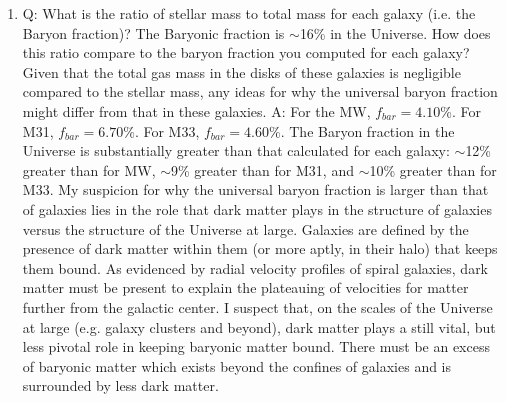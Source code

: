 \documentclass{aastex62}
\begin{document}
\begin{enumerate}
  \item Q: What is the ratio of stellar mass to total mass for each galaxy (i.e. the Baryon fraction)? The Baryonic fraction is $\sim$16\% in the Universe. How does this ratio compare to the baryon fraction you computed for each galaxy? Given that the total gas mass in the disks of these galaxies is negligible compared to the stellar mass, any ideas for why the universal baryon fraction might differ from that in these galaxies.
  \newline
  \newline
  A: For the MW, $f_{bar}=4.10\%$. For M31, $f_{bar}=6.70\%$. For M33, $f_{bar}=4.60\%$. The Baryon fraction in the Universe is substantially greater than that calculated for each galaxy: $\sim$12\% greater than for MW, $\sim$9\% greater than for M31, and $\sim$10\% greater than for M33. My suspicion for why the universal baryon fraction is larger than that of galaxies lies in the role that dark matter plays in the structure of galaxies versus the structure of the Universe at large. 
  \newline
  Galaxies are defined by the presence of dark matter within them (or more aptly, in their halo) that keeps them bound. As evidenced by radial velocity profiles of spiral galaxies, dark matter must be present to explain the plateauing of velocities for matter further from the galactic center. I suspect that, on the scales of the Universe at large (e.g. galaxy clusters and beyond), dark matter plays a still vital, but less pivotal role in keeping baryonic matter bound. There must be an excess of baryonic matter which exists beyond the confines of galaxies and is surrounded by less dark matter.
\end{enumerate}
\end{document}
